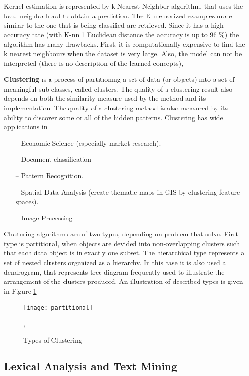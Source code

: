 Kernel estimation is represented by k-Nearest Neighbor algorithm, that uses the local neighborhood to obtain a prediction. The K memorized examples more similar to the one that is being classified are retrieved. Since it has a high accuracy rate (with K-nn 1 Euclidean distance the accuracy is up to 96 \%) the algorithm has many drawbacks. First, it is computationally expensive to find the k nearest neighbours when the dataset is very large. Also, the model can not be interpreted (there is no description of the learned concepts), \cite{k-neighbor}

\textbf{Clustering} is a process of partitioning a set of data (or objects) into a set of meaningful sub-classes, called clusters. The quality of a clustering result also depends on both the similarity measure used by the method and its implementation. The quality of a clustering method is also measured by its ability to discover some or all of the hidden patterns. Clustering has wide applications in

\begin{itemize}
\item[--] Economic Science (especially market research).
\item[--] Document classification
\item[--] Pattern Recognition.
\item[--] Spatial Data Analysis (create thematic maps in GIS by clustering feature spaces).
\item[--] Image Processing
\end{itemize}

Clustering algorithms are of two types, depending on problem that solve. First type is partitional, when objects are devided into non-overlapping clusters such that each data object is in exactly one subset. The hierarchical type represents a set of nested clusters organized as a hierarchy. In this case it is also used a dendrogram, that represents tree diagram frequently used to illustrate the arrangement of the clusters produced. An illustration of described types is given in Figure \ref{types}

\begin{figure}[!ht]
\centering
\texttt{[image: partitional]}
\caption{Types of Clustering}\label{types}, \cite{typescluster}
\end{figure}

\subsection{Lexical Analysis and Text Mining} \label{ssec:lexical}

